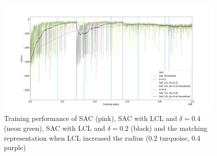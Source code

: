 \begin{figure}[htp]
	\centering
	\includegraphics[width=\linewidth]{figures/training2.png}
	\caption{Training performance of SAC (pink), SAC with LCL and $\delta=0.4$ (neon green), 
	SAC with LCL and $\delta=0.2$ (black) and the matching representation when LCL increased the radius (0.2 turquoise, 0.4 purple)}
	\label{fig:training2}
\end{figure}

\newpage

